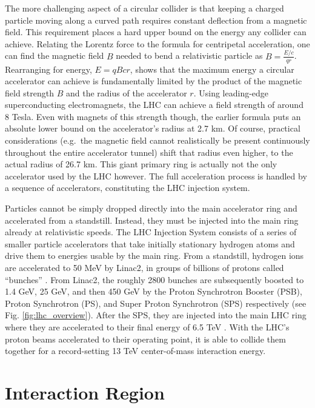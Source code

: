     The more challenging aspect of a circular collider is that keeping a charged particle moving along a curved path requires constant deflection from a magnetic field.
    This requirement places a hard upper bound on the energy any collider can achieve.
    Relating the Lorentz force to the formula for centripetal acceleration,
        one can find the magnetic field $B$ needed to bend a relativistic particle as $B=\frac{E/c}{q r}$.
    Rearranging for energy, $E = q B c r$, shows that the maximum energy a circular accelerator can achieve is fundamentally limited by the product of the magnetic field strength $B$ and the radius of the accelerator $r$.
    Using leading-edge superconducting electromagnets, the LHC can achieve a field strength of around 8 Tesla.
    Even with magnets of this strength though, the earlier formula puts an absolute lower bound on the accelerator's radius at 2.7 km.
    Of course, practical considerations (e.g.\ the magnetic field cannot realistically be present continuously throughout the entire accelerator tunnel) shift that radius even higher, to the actual radius of 26.7 km.
    This giant primary ring is actually not the only accelerator used by the LHC however.
    The full acceleration process is handled by a sequence of accelerators, constituting the LHC injection system.

    Particles cannot be simply dropped directly into the main accelerator ring and accelerated from a standstill.
    Instead, they must be injected into the main ring already at relativistic speeds.
    The LHC Injection System consists of a series of smaller particle accelerators
        that take initially stationary hydrogen atoms and drive them to energies usable by the main ring.
    From a standstill, hydrogen ions are accelerated to 50 MeV by Linac2, in groups of billions of protons called ``bunches'' \cite{lhc_run2}.
    From Linac2, the roughly 2800 bunches are subsequently boosted to 1.4 GeV, 25 GeV, and then 450 GeV by the Proton Synchrotron Booster (PSB), Proton Synchrotron (PS), and Super Proton Synchrotron (SPS) respectively (see Fig. \ref{fig:lhc_overview}).
    After the SPS, they are injected into the main LHC ring where they are accelerated to their final energy of 6.5 TeV \cite{lhc_machine}.
    With the LHC's proton beams accelerated to their operating point, it is able to collide them together for a record-setting 13 TeV center-of-mass interaction energy.


\section{Interaction Region} \label{sec:lhc-interaction_region}

